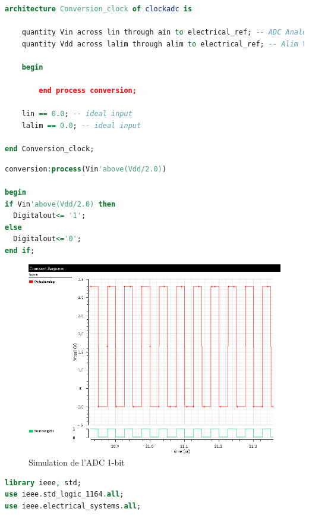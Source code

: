 \documentclass[a4paper]{article}
\begin{document}
\begin{lstlisting}[language=VHDL, belowskip=-0.5 \baselineskip]
architecture Conversion_clock of clockadc is

	quantity Vin across lin through ain to electrical_ref; -- ADC Analog input
	quantity Vdd across lalim through alim to electrical_ref; -- Alim Vdd input

	begin

		end process conversion;

	lin == 0.0; -- ideal input
	lalim == 0.0; -- ideal input

end Conversion_clock;
\end{lstlisting}

\begin{lstlisting}[language=VHDL, belowskip=-0.5 \baselineskip]
conversion:process(Vin'above(Vdd/2.0))

begin
if Vin'above(Vdd/2.0) then
  Digitalout<= '1';
else
  Digitalout<='0';
end if;
\end{lstlisting}


\begin{figure}[!htb]
\begin{center}
  \includegraphics[scale=0.50]{1bit-ADC-conversion-sim.png}
  \caption{Simulation de l'ADC 1-bit }
\end{center}
\end{figure}

\clearpage

\begin{lstlisting}[language=VHDL, belowskip=-0.5 \baselineskip]
library ieee, std;
use ieee.std_logic_1164.all;
use ieee.electrical_systems.all;
\end{lstlisting}
\end{document}
